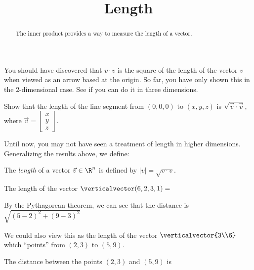 \documentclass{ximera}
\title{Length}
\begin{document}
\begin{abstract}
  The inner product provides a way to measure the length of a vector.
\end{abstract}

You should have discovered that $v\cdot v$ is the square of the length
of the vector $v$ when viewed as an arrow based at the origin.  So
far, you have only shown this in the $2$-dimensional case.  See if you
can do it in three dimensions.

Show that the length of the line segment from $(0,0,0)$ to $(x,y,z)$
is $\sqrt{\vec{v} \cdot \vec{v}}$, where $\vec{v} = \begin{bmatrix} x
  \\ y \\ z\end{bmatrix}$.

\begin{free-response}
  
\end{free-response}

Until now, you may not have seen a treatment of length in higher
dimensions.  Generalizing the results above, we define:

\begin{definition}
  The \textit{length} of a vector $\vec{v} \in \R^n$ is defined by $|v| = \sqrt{v \cdot v}$.
\end{definition}

\begin{question}
  \begin{solution}
    The length of the vector $\verticalvector(6,2,3,1)=$ 
  \end{solution}
\end{question}

\begin{question}
  \begin{solution}
    \begin{hint}
      By the Pythagorean theorem, we can see that  the distance is $\sqrt{(5-2)^2+(9-3)^2}$
    \end{hint}
    \begin{hint}
      We could also view this as the length of the vector $\verticalvector{3\\6}$ which ``points'' from $(2,3)$ to $(5,9)$.
    \end{hint}
    The distance between the points $(2,3)$ and $(5,9)$ is 
  \end{solution}
\end{question}
\end{document}
